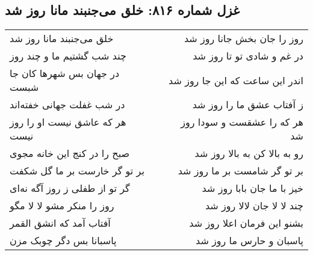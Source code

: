 \begin{center}
\section*{غزل شماره ۸۱۶: خلق می‌جنبند مانا روز شد}
\label{sec:0816}
\begin{longtable}{l p{0.5cm} r}
خلق می‌جنبند مانا روز شد
&&
روز را جان بخش جانا روز شد
\\
چند شب گشتیم ما و چند روز
&&
در غم و شادی تو تا روز شد
\\
در جهان بس شهرها کان جا شبست
&&
اندر این ساعت که این جا روز شد
\\
در شب غفلت جهانی خفته‌اند
&&
ز آفتاب عشق ما را روز شد
\\
هر که عاشق نیست او را روز نیست
&&
هر که را عشقست و سودا روز شد
\\
صبح را در کنج این خانه مجوی
&&
رو به بالا کن به بالا روز شد
\\
بر تو گر خارست بر ما گل شکفت
&&
بر تو گر شامست بر ما روز شد
\\
گر تو از طفلی ز روز آگه نه‌ای
&&
خیز با ما جان بابا روز شد
\\
روز را منکر مشو لا لا مگو
&&
چند لا لا جان لالا روز شد
\\
آفتاب آمد که انشق القمر
&&
بشنو این فرمان اعلا روز شد
\\
پاسبانا بس دگر چوبک مزن
&&
پاسبان و حارس ما روز شد
\\
\end{longtable}
\end{center}
